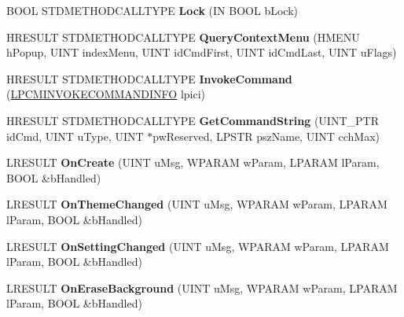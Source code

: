 \begin{DoxyCompactItemize}
B\+O\+OL S\+T\+D\+M\+E\+T\+H\+O\+D\+C\+A\+L\+L\+T\+Y\+PE {\bfseries Lock} (IN B\+O\+OL b\+Lock)
\item 
\mbox{\label{class_c_tray_window_afa527cd79417f196042ce5904c728637}} 
H\+R\+E\+S\+U\+LT S\+T\+D\+M\+E\+T\+H\+O\+D\+C\+A\+L\+L\+T\+Y\+PE {\bfseries Query\+Context\+Menu} (H\+M\+E\+NU h\+Popup, U\+I\+NT index\+Menu, U\+I\+NT id\+Cmd\+First, U\+I\+NT id\+Cmd\+Last, U\+I\+NT u\+Flags)
\item 
\mbox{\label{class_c_tray_window_ac2520bc2141f207d061c5acf7b8abb22}} 
H\+R\+E\+S\+U\+LT S\+T\+D\+M\+E\+T\+H\+O\+D\+C\+A\+L\+L\+T\+Y\+PE {\bfseries Invoke\+Command} (\hyperlink{struct_i_context_menu_1_1tag_c_m_i_n_v_o_k_e_c_o_m_m_a_n_d_i_n_f_o}{L\+P\+C\+M\+I\+N\+V\+O\+K\+E\+C\+O\+M\+M\+A\+N\+D\+I\+N\+FO} lpici)
\item 
\mbox{\label{class_c_tray_window_a6126e5bee152a7d34a0865bd20818e95}} 
H\+R\+E\+S\+U\+LT S\+T\+D\+M\+E\+T\+H\+O\+D\+C\+A\+L\+L\+T\+Y\+PE {\bfseries Get\+Command\+String} (U\+I\+N\+T\+\_\+\+P\+TR id\+Cmd, U\+I\+NT u\+Type, U\+I\+NT $\ast$pw\+Reserved, L\+P\+S\+TR psz\+Name, U\+I\+NT cch\+Max)
\item 
\mbox{\label{class_c_tray_window_ae453b2f7b4f543608faebe734fb0ff26}} 
L\+R\+E\+S\+U\+LT {\bfseries On\+Create} (U\+I\+NT u\+Msg, W\+P\+A\+R\+AM w\+Param, L\+P\+A\+R\+AM l\+Param, B\+O\+OL \&b\+Handled)
\item 
\mbox{\label{class_c_tray_window_a18cbea0a2712dd7df67e08e2cc719c63}} 
L\+R\+E\+S\+U\+LT {\bfseries On\+Theme\+Changed} (U\+I\+NT u\+Msg, W\+P\+A\+R\+AM w\+Param, L\+P\+A\+R\+AM l\+Param, B\+O\+OL \&b\+Handled)
\item 
\mbox{\label{class_c_tray_window_a0cec0468f2389e0cd1f41e40e93cdbd5}} 
L\+R\+E\+S\+U\+LT {\bfseries On\+Setting\+Changed} (U\+I\+NT u\+Msg, W\+P\+A\+R\+AM w\+Param, L\+P\+A\+R\+AM l\+Param, B\+O\+OL \&b\+Handled)
\item 
\mbox{\label{class_c_tray_window_a465de0071b1a6f0a88137e00913a5967}} 
L\+R\+E\+S\+U\+LT {\bfseries On\+Erase\+Background} (U\+I\+NT u\+Msg, W\+P\+A\+R\+AM w\+Param, L\+P\+A\+R\+AM l\+Param, B\+O\+OL \&b\+Handled)

\end{DoxyCompactItemize}
